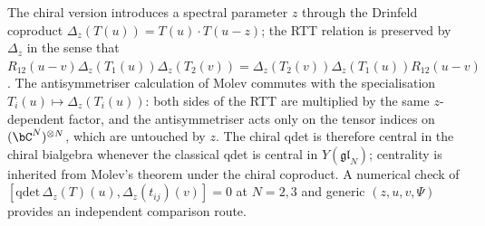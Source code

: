 \begin{lemma}
The chiral version introduces a spectral parameter $z$ through the
Drinfeld coproduct
$\Delta_z(T(u)) = T(u)\cdot T(u-z)$; the RTT relation is preserved
by $\Delta_z$ in the sense that
$R_{12}(u-v)\Delta_z(T_1(u))\Delta_z(T_2(v))
= \Delta_z(T_2(v))\Delta_z(T_1(u))R_{12}(u-v)$.
The antisymmetriser calculation of Molev commutes with the
specialisation $T_i(u) \mapsto \Delta_z(T_i(u))$: both sides of the
RTT are multiplied by the same $z$-dependent factor, and the
antisymmetriser acts only on the tensor indices on $(\bC^N)^{\otimes N}$,
which are untouched by $z$. The chiral qdet is therefore central in
the chiral bialgebra whenever the classical qdet is central in
$Y(\mathfrak{gl}_N)$; centrality is inherited from Molev's theorem
under the chiral coproduct. A numerical check of
$[\mathrm{qdet}\, \Delta_z(T)(u), \Delta_z(t_{ij})(v)] = 0$
at $N = 2, 3$ and generic $(z, u, v, \Psi)$ provides an independent
comparison route.
\end{lemma}

